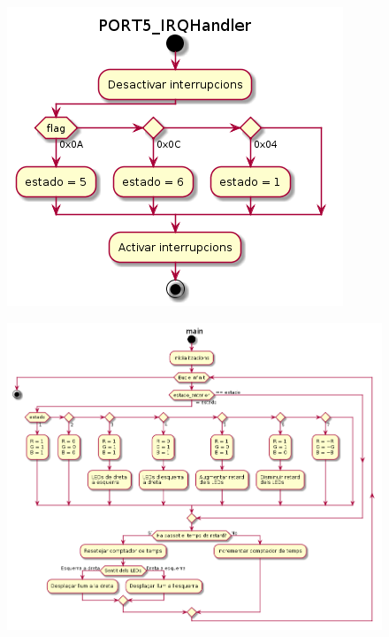 \documentclass[12pt,a4paper]{article}
\begin{document}
\begin{figure}[H]
  \centering
  \includegraphics[scale=.6]{PORT5_IRQHandler}
\end{figure}

\begin{figure}[H]
  \centering
  \includegraphics[width=\textwidth]{main}
\end{figure}
\end{document}
